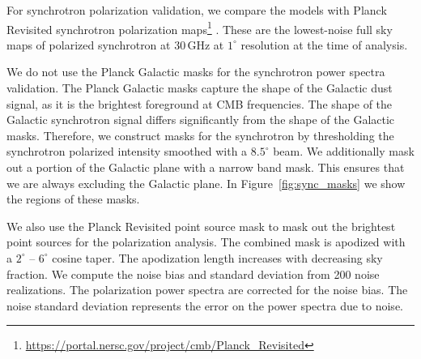 \documentclass[twocolumn]{aastex631}
\newcommand{\giuse}[1]{\textcolor{orange}{(GP: #1)}}
\begin{document}

For synchrotron polarization validation, we compare the models with Planck Revisited synchrotron polarization maps\footnote{\url{https://portal.nersc.gov/project/cmb/Planck\_Revisited}} \citep{Delabrouille:2024}. These are the lowest-noise full sky maps of polarized synchrotron at 30\,GHz at $1^\circ$ resolution at the time of analysis. 

We do not use the Planck Galactic masks for the synchrotron power spectra validation. The Planck Galactic masks capture the shape of the Galactic dust signal, as it is the brightest foreground at CMB frequencies. The shape of the Galactic synchrotron signal differs significantly from the shape of the Galactic masks. Therefore, we construct masks for the synchrotron by thresholding the synchrotron polarized intensity smoothed with a $8.5^\circ$ beam. We additionally mask out a portion of the Galactic plane with a narrow band mask. This ensures that we are always excluding the Galactic plane. In Figure~\ref{fig:sync_masks} we show the regions of these masks. 

We also use the Planck Revisited point source mask to mask out the brightest point sources for the polarization analysis. The combined mask is apodized with a $2^\circ$ -- $6^\circ$ cosine taper. The apodization length increases with decreasing sky fraction. We compute the noise bias and standard deviation from 200 noise realizations. The polarization power spectra are corrected for the noise bias. The noise standard deviation represents the error on the power spectra due to noise.

\end{document}
